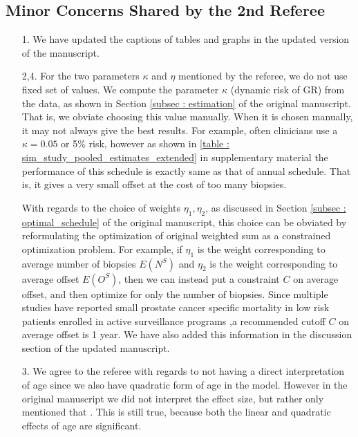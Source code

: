 \subsection*{Minor Concerns Shared by the 2nd Referee}

\begin{enumerate}
	\item[1.] We have updated the captions of tables and graphs in the updated version of the manuscript.
	\item[2,4.] For the two parameters $\kappa$ and $\eta$ mentioned by the referee, we do not use fixed set of values. We compute the parameter $\kappa$ (dynamic risk of GR) from the data, as shown in Section \ref{subsec : estimation} of the original manuscript. That is, we obviate choosing this value manually. When it is chosen manually, it may not always give the best results. For example, often clinicians use a $\kappa = 0.05$ or 5\% risk, however as shown in \ref{table : sim_study_pooled_estimates_extended} in supplementary material the performance of this schedule is exactly same as that of annual schedule. That is, it gives a very small offset at the cost of too many biopsies. 

	With regards to the choice of weights $\eta_1, \eta_2$, as discussed in Section \ref{subsec : optimal_schedule} of the original manuscript, this choice can be obviated by reformulating the optimization of original weighted sum as a constrained optimization problem. For example, if $\eta_1$ is the weight corresponding to average number of biopsies $E(N^S)$ and $\eta_2$ is the weight corresponding to average offset $E(O^S)$, then we can instead put a constraint $C$ on average offset, and then optimize for only the number of biopsies. Since multiple studies have reported small prostate cancer specific mortality in low risk patients enrolled in active surveillance programs \citep{loeb2016immediate,tosoian2011active,klotz2009clinical},a recommended cutoff $C$ on average offset is 1 year. We have also added this information in the discussion section of the updated manuscript.

	\item[3.] We agree to the referee with regards to not having a direct interpretation of age since we also have quadratic form of age in the model. However in the original manuscript we did not interpret the effect size, but rather only mentioned that . This is still true, because both the linear and quadratic effects of age are significant.
\end{enumerate}

